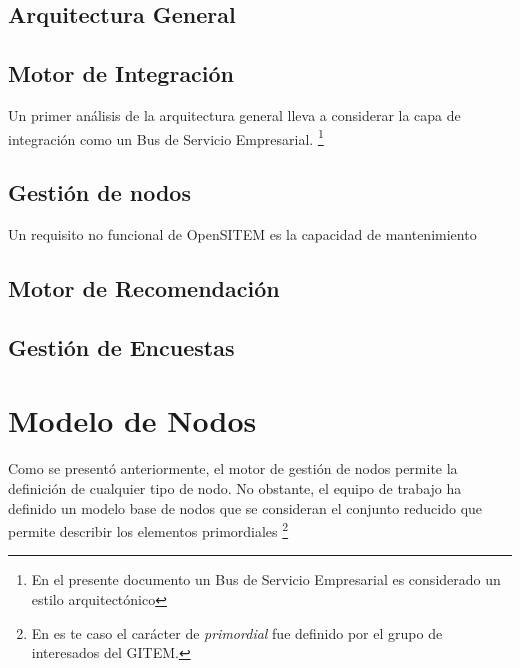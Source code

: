 \subsection{Arquitectura General}






\subsection{Motor de Integración}

Un primer análisis de la arquitectura general lleva a considerar la capa de integración como un Bus de Servicio Empresarial. \footnote{En el presente documento un Bus de Servicio Empresarial es considerado un estilo arquitectónico}









\subsection{Gestión de nodos}

Un requisito no funcional de OpenSITEM es la capacidad de mantenimiento


\subsection{Motor de Recomendación}


\subsection{Gestión de Encuestas}






\section{Modelo de Nodos}

Como se presentó anteriormente, el motor de gestión de nodos permite la definición de cualquier tipo de nodo. No obstante, el equipo de trabajo ha definido un modelo base de nodos que se consideran el conjunto reducido que permite describir los elementos primordiales \footnote{En es te caso el carácter de \textit{primordial} fue definido por el grupo de interesados del GITEM.}

















